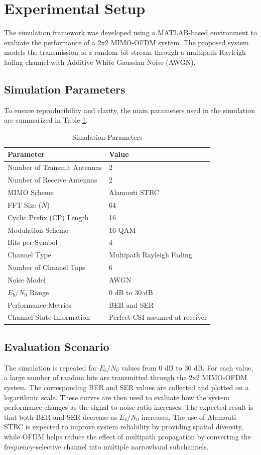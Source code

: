 \documentclass[a4paper]{article}
\begin{document}
\section{Experimental Setup}
The simulation framework was developed using a MATLAB-based environment to evaluate the performance of a 2x2 MIMO-OFDM system. The proposed system models the transmission of a random bit stream through a multipath Rayleigh fading channel with Additive White Gaussian Noise (AWGN).

\subsection{Simulation Parameters}
To ensure reproducibility and clarity, the main parameters used in the simulation are summarized in Table \ref{tab:params}.

\begin{table}[H]
\centering
\caption{Simulation Parameters}
\label{tab:params}
\vspace{0.2cm}
\begin{tabular}{ll}
\toprule
\textbf{Parameter} & \textbf{Value} \\
\midrule
Number of Transmit Antennas & 2 \\
Number of Receive Antennas & 2 \\
MIMO Scheme & Alamouti STBC \\
FFT Size ($N$) & 64 \\
Cyclic Prefix (CP) Length & 16 \\
Modulation Scheme & 16-QAM \\
Bits per Symbol & 4 \\
Channel Type & Multipath Rayleigh Fading \\
Number of Channel Taps & 6 \\
Noise Model & AWGN \\
$E_b/N_0$ Range & 0 dB to 30 dB \\
Performance Metrics & BER and SER \\
Channel State Information & Perfect CSI assumed at receiver \\
\bottomrule
\end{tabular}
\end{table}

\subsection{Evaluation Scenario}
The simulation is repeated for $E_b/N_0$ values from 0 dB to 30 dB. For each value, a large number of random bits are transmitted through the 2x2 MIMO-OFDM system. The corresponding BER and SER values are collected and plotted on a logarithmic scale. These curves are then used to evaluate how the system performance changes as the signal-to-noise ratio increases. The expected result is that both BER and SER decrease as $E_b/N_0$ increases. The use of Alamouti STBC is expected to improve system reliability by providing spatial diversity, while OFDM helps reduce the effect of multipath propagation by converting the frequency-selective channel into multiple narrowband subchannels.
\end{document}
